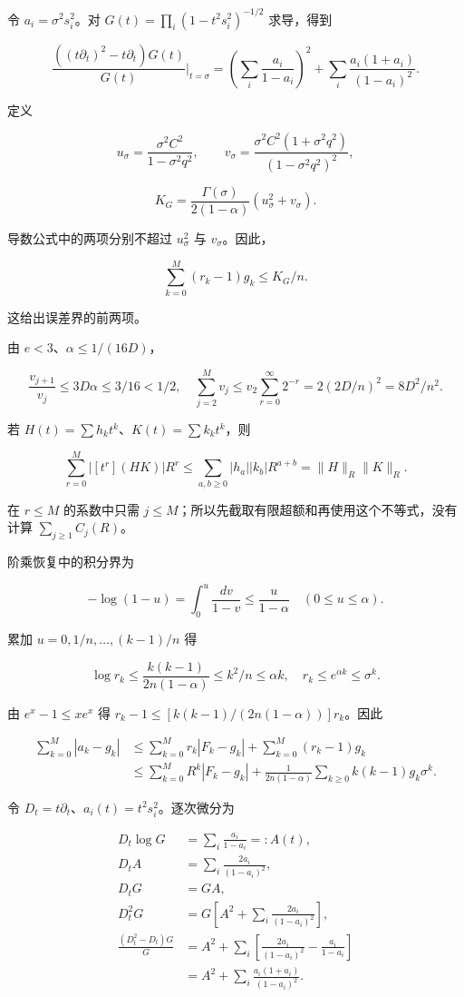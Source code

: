 \documentclass[11pt,a4paper]{article}
\begin{document}
令 \(a_i=\sigma^2s_i^2\)。对 \(G(t)=\prod_i(1-t^2s_i^2)^{-1/2}\) 求导，得到

\[
\frac{\left((t\partial_t)^2-t\partial_t\right)G(t)}{G(t)}
\bigg|_{t=\sigma}
=\left(\sum_i\frac{a_i}{1-a_i}\right)^2
+\sum_i\frac{a_i(1+a_i)}{(1-a_i)^2}.
\]

定义

\[
u_\sigma=\frac{\sigma^2C^2}{1-\sigma^2q^2},
\qquad
v_\sigma=\frac{\sigma^2C^2(1+\sigma^2q^2)}
{(1-\sigma^2q^2)^2},
\]

\[
K_G=\frac{\Gamma(\sigma)}{2(1-\alpha)}
\left(u_\sigma^2+v_\sigma\right).
\]

导数公式中的两项分别不超过 \(u_\sigma^2\) 与 \(v_\sigma\)。因此，

\[
\sum_{k=0}^{M}(r_k-1)g_k\le K_G/n.
\]

这给出误差界的前两项。

由 \(e<3\)、\(\alpha\le1/(16D)\)，

\[
\frac{v_{j+1}}{v_j}\le3D\alpha\le3/16<1/2,
\quad
\sum_{j=2}^Mv_j\le v_2\sum_{r=0}^{\infty}2^{-r}
=2(2D/n)^2=8D^2/n^2.
\]

若 \(H(t)=\sum h_kt^k\)、\(K(t)=\sum k_kt^k\)，则

\[
\sum_{r=0}^M|[t^r](HK)|R^r
\le\sum_{a,b\ge0}|h_a||k_b|R^{a+b}
=\|H\|_R\|K\|_R.
\]

在 \(r\le M\) 的系数中只需 \(j\le M\)；所以先截取有限超额和再使用这个不等式，没有计算 \(\sum_{j\ge1}C_j(R)\)。

阶乘恢复中的积分界为

\[
-\log(1-u)=\int_0^u\frac{dv}{1-v}\le\frac{u}{1-\alpha}
\quad(0\le u\le\alpha).
\]

累加 \(u=0,1/n,\ldots,(k-1)/n\) 得

\[
\log r_k\le\frac{k(k-1)}{2n(1-\alpha)}\le k^2/n\le\alpha k,
\quad r_k\le e^{\alpha k}\le\sigma^k.
\]

由 \(e^x-1\le xe^x\) 得 \(r_k-1\le[k(k-1)/(2n(1-\alpha))]r_k\)。因此

\[
\begin{aligned}
\sum_{k=0}^M|a_k-g_k|
&\le\sum_{k=0}^Mr_k|F_k-g_k|+\sum_{k=0}^M(r_k-1)g_k\\
&\le\sum_{k=0}^MR^k|F_k-g_k|
+\frac1{2n(1-\alpha)}\sum_{k\ge0}k(k-1)g_k\sigma^k.
\end{aligned}
\]

令 \(D_t=t\partial_t\)、\(a_i(t)=t^2s_i^2\)。逐次微分为

\[
\begin{aligned}
D_t\log G&=\sum_i\frac{a_i}{1-a_i}=:A(t),\\
D_tA&=\sum_i\frac{2a_i}{(1-a_i)^2},\\
D_tG&=GA,\\
D_t^2G&=G\left[A^2+\sum_i\frac{2a_i}{(1-a_i)^2}\right],\\
\frac{(D_t^2-D_t)G}{G}
&=A^2+\sum_i\left[\frac{2a_i}{(1-a_i)^2}-\frac{a_i}{1-a_i}\right]\\
&=A^2+\sum_i\frac{a_i(1+a_i)}{(1-a_i)^2}.
\end{aligned}
\]
\end{document}
